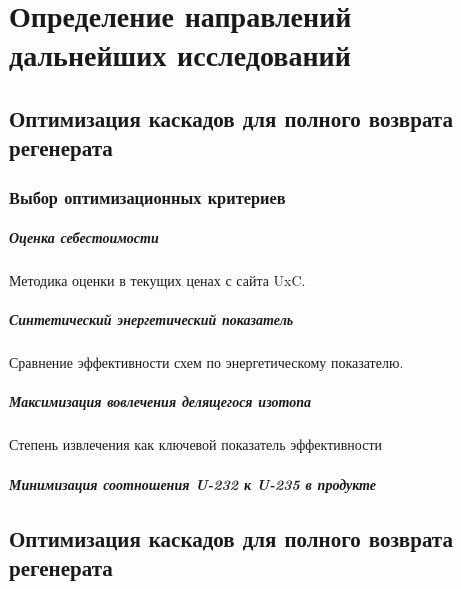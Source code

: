 \chapter{Определение направлений дальнейших исследований}\label{ch:ch2}

\section{Оптимизация каскадов для полного возврата регенерата}\label{sec:ch2/sec1}
\subsection{Выбор оптимизационных критериев}\label{sec:ch2/sec1}

\paragraph{Оценка себестоимости}
Методика оценки в текущих ценах с сайта UxC.
\paragraph{Синтетический энергетический показатель}
Сравнение эффективности схем по энергетическому показателю.
\paragraph{Максимизация вовлечения делящегося изотопа}
Степень извлечения как ключевой показатель эффективности
\paragraph{Минимизация соотношения U-232 к U-235 в продукте}

\section{Оптимизация каскадов для полного возврата регенерата}\label{sec:ch2/sec1}








